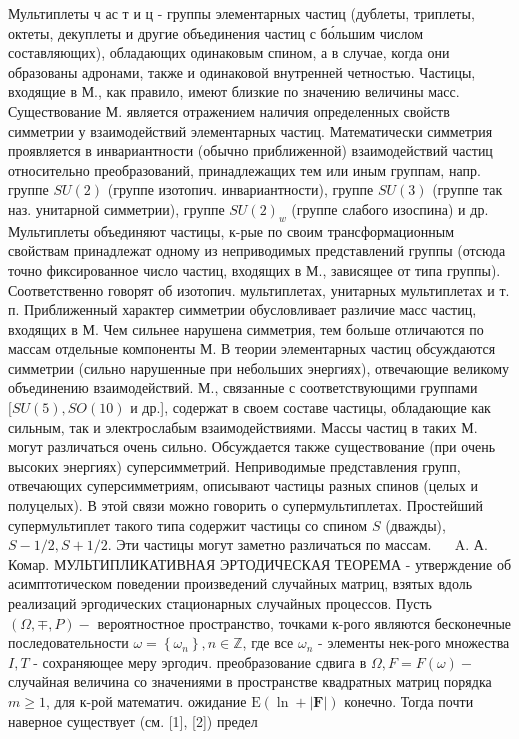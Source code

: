 \documentclass[10pt]{article}
\begin{document}
Мультиплеты ч ас т и ц - группы элементарных частиц (дублеты, триплеты, октеты, декуплеты и другие объединения частиц с бо́льшим числом составляющих), обладающих одинаковым спином, а в случае, когда они образованы адронами, также и одинаковой внутренней четностью. Частицы, входящие в М., как правило, имеют близкие по значению величины масс. Существование М. является отражением наличия определенных свойств симметрии у взаимодействий элементарных частиц. Математически симметрия проявляется в инвариантности (обычно приближенной) взаимодействий частиц относительно преобразований, принадлежащих тем или иным группам, напр. группе $S U(2)$ (группе изотопич. инвариантности), группе $S U(3)$ (группе так наз. унитарной симметрии), группе $S U(2)_{w}$ (группе слабого изоспина) и др. Мультиплеты объединяют частицы, к-рые по своим трансформационным свойствам принадлежат одному из неприводимых представлений группы (отсюда точно фиксированное число частиц, входящих в М., зависящее от типа группы). Соответственно говорят об изотопич. мультиплетах, унитарных мультиплетах и т. п. Приближенный характер симметрии обусловливает различие масс частиц, входящих в М. Чем сильнее нарушена симметрия, тем больше отличаются по массам отдельные компоненты М. В теории элементарных частиц обсуждаются симметрии (сильно нарушенные при небольших энергиях), отвечающие великому объединению взаимодействий. М., связанные с соответствующими группами $[S U(5), S O(10)$ и др.], содержат в своем составе частицы, обладающие как сильным, так и электрослабым взаимодействиями. Массы частиц в таких М. могут различаться очень сильно. Обсуждается также существование (при очень высоких энергиях) суперсимметрий. Неприводимые представления групп, отвечающих суперсимметриям, описывают частицы разных спинов (целых и полуцелых). В этой связи можно говорить о супермультиплетах. Простейший супермультиплет такого типа содержит частицы со спином $S$ (дважды), $S-1 / 2, S+1 / 2$. Эти частицы могут заметно различаться по массам. $\quad$ A. А. Комар. МУЛЬТИПЛИКАТИВНАЯ ЭРТОДИЧЕСКАЯ ТЕОРЕМА - утверждение об асимптотическом поведении произведений случайных матриц, взятых вдоль реализаций эргодических стационарных случайных процессов. Пусть $(\Omega, \mp, P)-$ вероятностное пространство, точками к-рого являются бесконечные последовательности $\omega=\left\{\omega_{n}\right\}, n \in \mathbb{Z}$, где все $\omega_{n}$ - элементы нек-рого множества $I, T$ - сохраняющее меру эргодич. преобразование сдвига в $\Omega, F=F(\omega)-$ случайная величина со значениями в пространстве квадратных матриц порядка $m \geqslant 1$, для к-рой математич. ожидание $\mathrm{E}(\ln +|\boldsymbol{F}|)$ конечно. Тогда почти наверное существует (см. [1], [2]) предел
\end{document}
